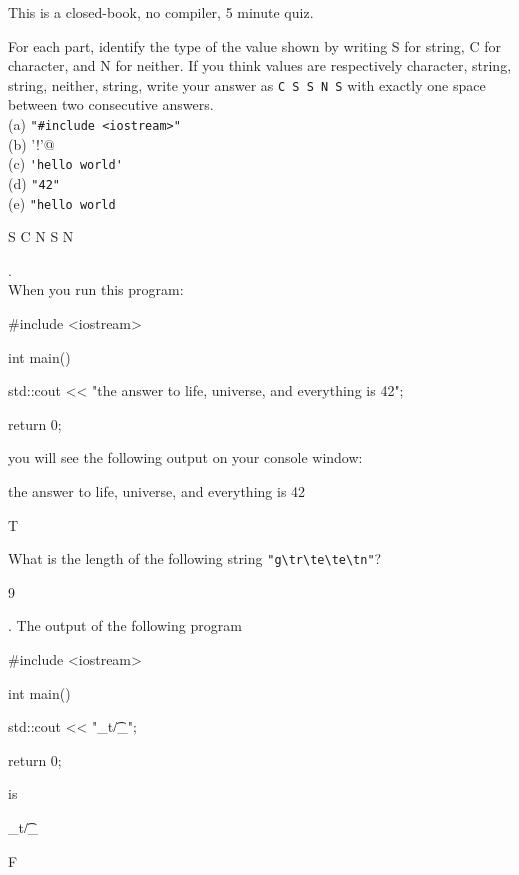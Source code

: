 

This is a closed-book, no compiler, 5 minute quiz.

\nextq
For each part, identify the type of the value shown
by writing S for string, C for character, and N for neither.
If you think values are respectively character, string, string, neither,
string, write your answer as \verb!C S S N S! with exactly one
space between two consecutive answers.
\\
(a) \verb!"#include <iostream>"!
\\
(b) \verb@'!'@
\\
(c) \verb!'hello world'!
\\
(d) \verb!"42"!
\\
(e) \verb!"hello world!
\\
\ANSWER
\begin{answercode}
S C N S N
\end{answercode}

\nextq \tf.
\\
When you run this program:
\begin{console}[fontsize=\small]
#include <iostream>

int main()
{
    std::cout << "the answer to life, universe, and everything is 42\n";

    return 0;
}
\end{console}
you will see the following output on your console window:
\begin{console}[fontsize=\small]
the answer to life, universe, and everything is 42\n
\end{console}
\ANSWER
\begin{answercode}
T
\end{answercode}

\nextq
What is the length of the following string \verb!"g\tr\te\te\tn"!?
\\
\ANSWER
\begin{answercode}
9
\end{answercode}

\nextq \tf.
The output of the following program
\begin{console}[fontsize=\small]
#include <iostream>

int main()
{
    std::cout << "_t/\t_\n";

    return 0;
}
\end{console}
is
\begin{console}[fontsize=\small]
_t/\t_
\end{console}
\ANSWER
\begin{answercode}
F
\end{answercode}


